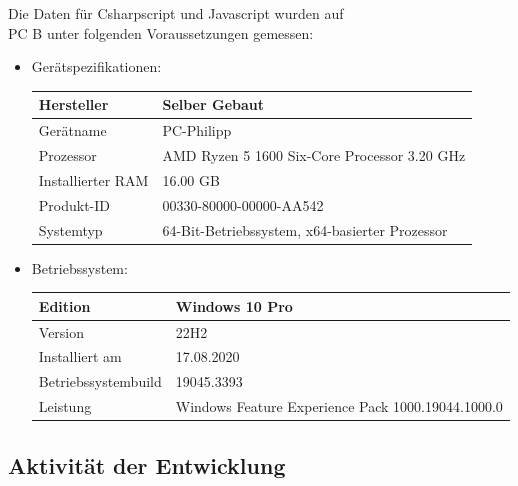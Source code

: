 \newpage
Die Daten für Csharpscript und Javascript wurden auf \\
PC B unter folgenden Voraussetzungen  gemessen:
\begin{itemize}
    \item Gerätspezifikationen:
    \begin{table}[H]
        \center
        \begin{tabular}{|p{3cm}|p{3cm}|}
            \hline
            Hersteller & Selber Gebaut \\ \hline
            Gerätname & PC-Philipp \\ \hline
            Prozessor & AMD Ryzen 5 1600 Six-Core Processor 3.20 GHz \\ \hline
            Installierter RAM & 16.00 GB \\ \hline
            Produkt-ID & 00330-80000-00000-AA542 \\ \hline
            Systemtyp & 64-Bit-Betriebssystem, x64-basierter Prozessor \\ \hline
        \end{tabular}
    \end{table}
    \item Betriebssystem:
    \begin{table}[H]
        \center
        \begin{tabular}{|p{4cm}|p{4cm}|}
            \hline
            Edition & Windows 10 Pro \\ \hline
            Version & 22H2 \\ \hline
            Installiert am & 17.08.2020 \\ \hline
            Betriebssystembuild & 19045.3393 \\ \hline
            Leistung & Windows Feature Experience Pack 1000.19044.1000.0 \\ \hline
        \end{tabular}        
    \end{table}
\end{itemize}


\newpage
\subsection{Aktivität der Entwicklung}

